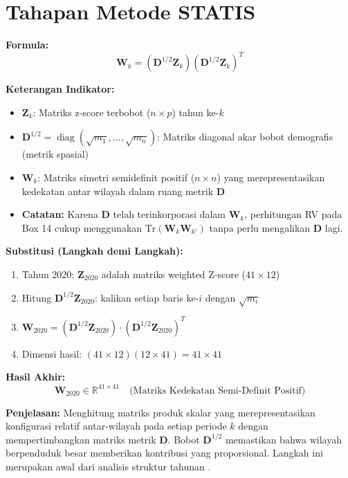 \documentclass[11pt,a4paper]{article}
\begin{document}
\section{Tahapan Metode STATIS}
\begin{tcolorbox}[formula_box, title={13. Intra-struktur: Matriks Skalar Produk ($\mathbf{W}_k$)}]
\textbf{Formula:}
\[ \mathbf{W}_k = (\mathbf{D}^{1/2}\mathbf{Z}_k) (\mathbf{D}^{1/2}\mathbf{Z}_k)^T \]

\textbf{Keterangan Indikator:}
\begin{itemize}
  \item $\mathbf{Z}_k$: Matriks z-score terbobot ($n \times p$) tahun ke-$k$
  \item $\mathbf{D}^{1/2} = \operatorname{diag}(\sqrt{m_1}, \ldots, \sqrt{m_n})$: Matriks diagonal akar bobot demografis (metrik spasial)
  \item $\mathbf{W}_k$: Matriks simetri semidefinit positif ($n \times n$) yang merepresentasikan kedekatan antar wilayah dalam ruang metrik $\mathbf{D}$ \citet{lavit94}
  \item \textbf{Catatan:} Karena $\mathbf{D}$ telah terinkorporasi dalam $\mathbf{W}_k$, perhitungan RV pada Box 14 cukup menggunakan $\mathrm{Tr}(\mathbf{W}_k \mathbf{W}_{k'})$ tanpa perlu mengalikan $\mathbf{D}$ lagi.
\end{itemize}

\textbf{Substitusi (Langkah demi Langkah):}
\begin{enumerate}
  \item Tahun 2020: $\mathbf{Z}_{2020}$ adalah matriks weighted Z-score ($41 \times 12$)
  \item Hitung $\mathbf{D}^{1/2}\mathbf{Z}_{2020}$: kalikan setiap baris ke-$i$ dengan $\sqrt{m_i}$
  \item $\mathbf{W}_{2020} = (\mathbf{D}^{1/2}\mathbf{Z}_{2020}) \cdot (\mathbf{D}^{1/2}\mathbf{Z}_{2020})^T$
  \item Dimensi hasil: $(41 \times 12)(12 \times 41) = 41 \times 41$
\end{enumerate}

\textbf{Hasil Akhir:}
\[ \mathbf{W}_{2020} \in \mathbb{R}^{41 \times 41} \quad \text{(Matriks Kedekatan Semi-Definit Positif)} \]

\textbf{Penjelasan:} Menghitung matriks produk skalar yang merepresentasikan konfigurasi relatif antar-wilayah pada setiap periode $k$ dengan mempertimbangkan matriks metrik $\mathbf{D}$. Bobot $\mathbf{D}^{1/2}$ memastikan bahwa wilayah berpenduduk besar memberikan kontribusi yang proporsional. Langkah ini merupakan awal dari analisis struktur tahunan \citet{lavit94}.
\end{tcolorbox}
\end{document}
